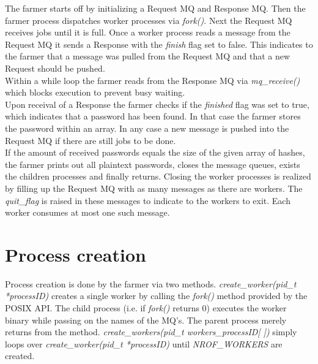 \documentclass{article}
\begin{document}
The farmer starts off by initializing a Request MQ and Response MQ. Then the farmer process dispatches worker processes via \textit{fork()}. Next the Request MQ receives jobs until it is full.
Once a worker process reads a message from the Request MQ it sends a Response with the \textit{finish} flag set to false. This indicates to the farmer that a message was pulled from the Request MQ and that a new Request should be pushed.\\
Within a while loop the farmer reads from the Response MQ via \textit{mq\_receive()} which blocks execution to prevent busy waiting.\\
Upon receival of a Response the farmer checks if the \textit{finished} flag was set to true, which indicates that a password has been found. In that case the farmer stores the password within an array. In any case a new message is pushed into the Request MQ if there are still jobs to be done.\\
If the amount of received passwords equals the size of the given array of hashes, the farmer prints out all plaintext passwords, closes the message queues, exists the children processes and finally returns. Closing the worker processes is realized by filling up the Request MQ with as many messages as there are workers. The \textit{quit\_flag} is raised in these messages to indicate to the workers to exit. Each worker consumes at most one such message.

\section{Process creation}%
\label{sec:process_creation}

Process creation is done by the farmer via two methods. \textit{create\_worker(pid\_t *processID)} creates a single worker by calling the \textit{fork()} method provided by the POSIX API. The child process (i.e. if \textit{fork()} returns 0) executes the worker binary while passing on the names of the MQ's. The parent process merely returns from the method. \textit{create\_workers(pid\_t workers\_processID[  ])} simply loops over \textit{create\_worker(pid\_t *processID)} until \textit{NROF\_WORKERS} are created.
\end{document}
